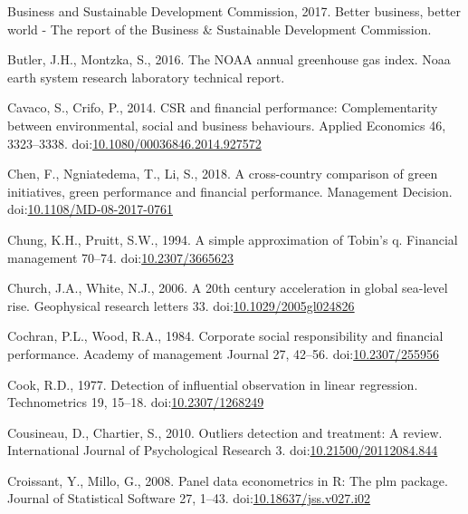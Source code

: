 \documentclass[12pt,]{article}
\begin{document}
\hypertarget{ref-BusinessandSustainableDevelopmentCommission2017}{}
Business and Sustainable Development Commission, 2017. Better business,
better world - The report of the Business \& Sustainable Development
Commission.

\hypertarget{ref-Butler2016}{}
Butler, J.H., Montzka, S., 2016. The NOAA annual greenhouse gas index.
Noaa earth system research laboratory technical report.

\hypertarget{ref-Cavaco2014}{}
Cavaco, S., Crifo, P., 2014. CSR and financial performance:
Complementarity between environmental, social and business behaviours.
Applied Economics 46, 3323--3338.
doi:\href{https://doi.org/10.1080/00036846.2014.927572}{10.1080/00036846.2014.927572}

\hypertarget{ref-Chencrosscountrycomparisongreen2018}{}
Chen, F., Ngniatedema, T., Li, S., 2018. A cross-country comparison of
green initiatives, green performance and financial performance.
Management Decision.
doi:\href{https://doi.org/10.1108/MD-08-2017-0761}{10.1108/MD-08-2017-0761}

\hypertarget{ref-Chung1994}{}
Chung, K.H., Pruitt, S.W., 1994. A simple approximation of Tobin's q.
Financial management 70--74.
doi:\href{https://doi.org/10.2307/3665623}{10.2307/3665623}

\hypertarget{ref-Church2006}{}
Church, J.A., White, N.J., 2006. A 20th century acceleration in global
sea-level rise. Geophysical research letters 33.
doi:\href{https://doi.org/10.1029/2005gl024826}{10.1029/2005gl024826}

\hypertarget{ref-Cochran1984a}{}
Cochran, P.L., Wood, R.A., 1984. Corporate social responsibility and
financial performance. Academy of management Journal 27, 42--56.
doi:\href{https://doi.org/10.2307/255956}{10.2307/255956}

\hypertarget{ref-Cook1977}{}
Cook, R.D., 1977. Detection of influential observation in linear
regression. Technometrics 19, 15--18.
doi:\href{https://doi.org/10.2307/1268249}{10.2307/1268249}

\hypertarget{ref-Cousineau2010}{}
Cousineau, D., Chartier, S., 2010. Outliers detection and treatment: A
review. International Journal of Psychological Research 3.
doi:\href{https://doi.org/10.21500/20112084.844}{10.21500/20112084.844}

\hypertarget{ref-Croissant2008}{}
Croissant, Y., Millo, G., 2008. Panel data econometrics in R: The plm
package. Journal of Statistical Software 27, 1--43.
doi:\href{https://doi.org/10.18637/jss.v027.i02}{10.18637/jss.v027.i02}
\end{document}
